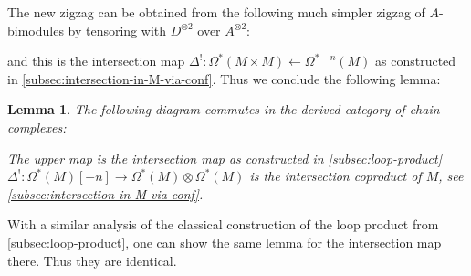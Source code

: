 \documentclass{scrartcl}
\theoremstyle{plain}
\newtheorem{lemma}[theorem]{Lemma}
\theoremstyle{definition}
\DeclareMathOperator{\cone}{cone}
\newcommand{\quiso}{\simeq}
\newcommand{\from}{\leftarrow}
\DeclareMathOperator{\id}{id}
\DeclareMathOperator{\cConf}{\overline{Conf}}
\begin{document}
The new zigzag can be obtained from the following much simpler zigzag of $A$-bimodules by tensoring with $D^{\otimes 2}$ over $A^{\otimes 2}$:
\begin{center}
\end{center}

and this is the intersection map $\Delta^!\colon\Omega^*(M\times M)\from \Omega^{*-n}(M)$ as constructed in \ref{subsec:intersection-in-M-via-conf}. Thus we conclude the following lemma:

\begin{lemma}
    The following diagram commutes in the derived category of chain complexes:
    \begin{center}
    \end{center}
    The upper map is the intersection map as constructed in \cref{subsec:loop-product}
    $\Delta^!\colon \Omega^*(M)[-n]\to\Omega^*(M)\otimes \Omega^*(M)$ is the intersection coproduct of $M$, see \cref{subsec:intersection-in-M-via-conf}.
\end{lemma}
With a similar analysis of the classical construction of the loop product from \ref{subsec:loop-product}, one can show the same lemma for the intersection map there. Thus they are identical.
\end{document}
